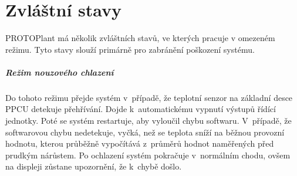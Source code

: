 \chapter{Zvláštní stavy}
PROTOPlant má několik zvláštních stavů, ve kterých pracuje v omezeném režimu.
Tyto stavy slouží primárně pro zabránění poškození systému.

\paragraph{Režim nouzového chlazení}
\label{paragraph:CoolingMode}
Do tohoto režimu přejde systém v~případě, že teplotní senzor na základní desce PPCU detekuje přehřívání. 
Dojde k~automatickému vypnutí výstupů řídící jednotky.
Poté se systém restartuje, aby vyloučil chybu softwaru.
V~případě, že softwarovou chybu nedetekuje, vyčká, než se teplota sníží na běžnou provozní hodnotu, kterou průběžně vypočítává z~průměrů hodnot naměřených před prudkým nárůstem.
Po ochlazení systém pokračuje v~normálním chodu, ovšem na displeji zůstane upozornění, že k~chybě došlo.

\newpage